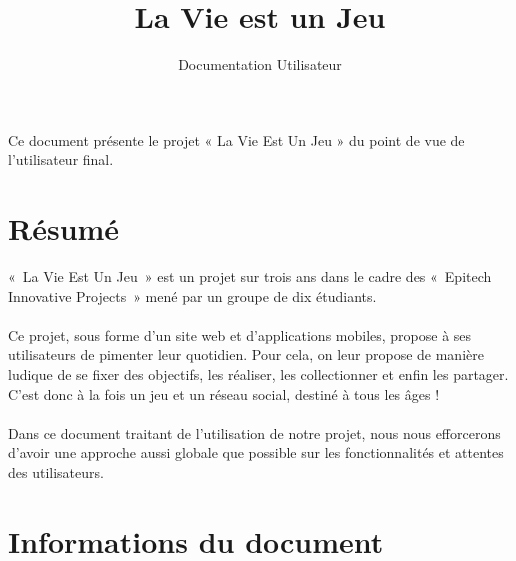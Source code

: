 \documentclass{life-fr}
\begin{document}
\title{La Vie est un Jeu}
\subtitle{Documentation Utilisateur}

\summary
{
	Ce document présente le projet « La Vie Est Un Jeu » du point de vue de l'utilisateur final.
}

\maketitle
\authorspage


\chapter*{Résumé}
{
	«~La Vie Est Un Jeu~» est un projet sur trois ans dans le cadre des «~Epitech
	Innovative Projects~» mené par un groupe de dix étudiants.\\
	\\
	Ce projet, sous forme d'un site web et d'applications mobiles, propose à
	ses utilisateurs de pimenter leur quotidien. Pour cela, on leur propose
	de manière ludique de se fixer des objectifs, les réaliser, les collectionner
	et enfin les partager.\\
	C'est donc à la fois un jeu et un réseau social, destiné à tous les âges !\\
	\\

	Dans ce document traitant de l'utilisation de notre projet, nous nous efforcerons d'avoir une approche aussi globale que possible sur les fonctionnalités et attentes des utilisateurs.
}

\chapter*{Informations du document}
\end{document}
